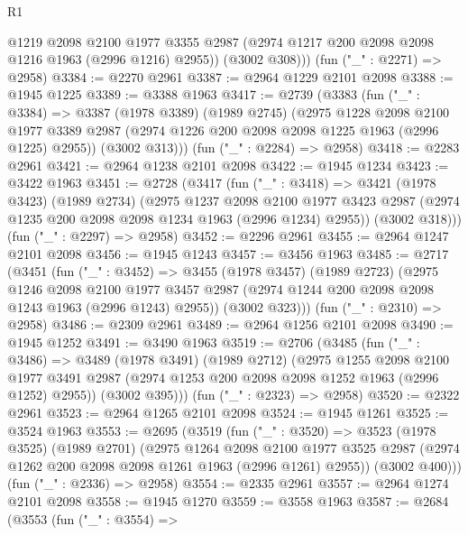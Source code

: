 \begin{lexlean}{R1}
\begin{coremodule}
          @1219
          @2098
          @2100
          @1977
          @3355
          @2987
          (@2974 @1217 @200 @2098 @2098 @1216 @1963 (@2996 @1216) @2955))
        (@3002 @308)))
    (fun ("_" : @2271) => @2958)
@3384 := @2270 @2961
@3387 := @2964 @1229 @2101 @2098
@3388 := @1945 @1225
@3389 := @3388 @1963
@3417 := @2739
    (@3383
      (fun ("_" : @3384) =>
      @3387
        (@1978 @3389)
        (@1989 @2745)
        (@2975
          @1228
          @2098
          @2100
          @1977
          @3389
          @2987
          (@2974 @1226 @200 @2098 @2098 @1225 @1963 (@2996 @1225) @2955))
        (@3002 @313)))
    (fun ("_" : @2284) => @2958)
@3418 := @2283 @2961
@3421 := @2964 @1238 @2101 @2098
@3422 := @1945 @1234
@3423 := @3422 @1963
@3451 := @2728
    (@3417
      (fun ("_" : @3418) =>
      @3421
        (@1978 @3423)
        (@1989 @2734)
        (@2975
          @1237
          @2098
          @2100
          @1977
          @3423
          @2987
          (@2974 @1235 @200 @2098 @2098 @1234 @1963 (@2996 @1234) @2955))
        (@3002 @318)))
    (fun ("_" : @2297) => @2958)
@3452 := @2296 @2961
@3455 := @2964 @1247 @2101 @2098
@3456 := @1945 @1243
@3457 := @3456 @1963
@3485 := @2717
    (@3451
      (fun ("_" : @3452) =>
      @3455
        (@1978 @3457)
        (@1989 @2723)
        (@2975
          @1246
          @2098
          @2100
          @1977
          @3457
          @2987
          (@2974 @1244 @200 @2098 @2098 @1243 @1963 (@2996 @1243) @2955))
        (@3002 @323)))
    (fun ("_" : @2310) => @2958)
@3486 := @2309 @2961
@3489 := @2964 @1256 @2101 @2098
@3490 := @1945 @1252
@3491 := @3490 @1963
@3519 := @2706
    (@3485
      (fun ("_" : @3486) =>
      @3489
        (@1978 @3491)
        (@1989 @2712)
        (@2975
          @1255
          @2098
          @2100
          @1977
          @3491
          @2987
          (@2974 @1253 @200 @2098 @2098 @1252 @1963 (@2996 @1252) @2955))
        (@3002 @395)))
    (fun ("_" : @2323) => @2958)
@3520 := @2322 @2961
@3523 := @2964 @1265 @2101 @2098
@3524 := @1945 @1261
@3525 := @3524 @1963
@3553 := @2695
    (@3519
      (fun ("_" : @3520) =>
      @3523
        (@1978 @3525)
        (@1989 @2701)
        (@2975
          @1264
          @2098
          @2100
          @1977
          @3525
          @2987
          (@2974 @1262 @200 @2098 @2098 @1261 @1963 (@2996 @1261) @2955))
        (@3002 @400)))
    (fun ("_" : @2336) => @2958)
@3554 := @2335 @2961
@3557 := @2964 @1274 @2101 @2098
@3558 := @1945 @1270
@3559 := @3558 @1963
@3587 := @2684
    (@3553
      (fun ("_" : @3554) =>

\end{coremodule}
\end{lexlean}
